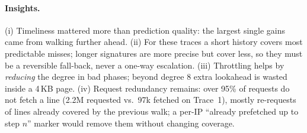 \documentclass[11pt,a4paper]{article}
\theoremstyle{themethm}
\theoremstyle{themedef}
\theoremstyle{themeex}
\theoremstyle{themerem}
\begin{document}
\paragraph{Insights.} (i) Timeliness mattered more than prediction quality:
the largest single gains came from walking further ahead. (ii) For these
traces a short history covers most predictable misses; longer signatures are
more precise but cover less, so they must be a reversible fall-back, never a
one-way escalation. (iii) Throttling helps by \emph{reducing} the degree in bad
phases; beyond degree 8 extra lookahead is wasted inside a 4\,KB page.
(iv) Request redundancy remains: over 95\% of requests do not fetch a line
(2.2M requested vs.\ 97k fetched on Trace~1), mostly re-requests of lines
already covered by the previous walk; a per-IP
``already prefetched up to step $n$'' marker would remove them without changing
coverage.
\end{document}
